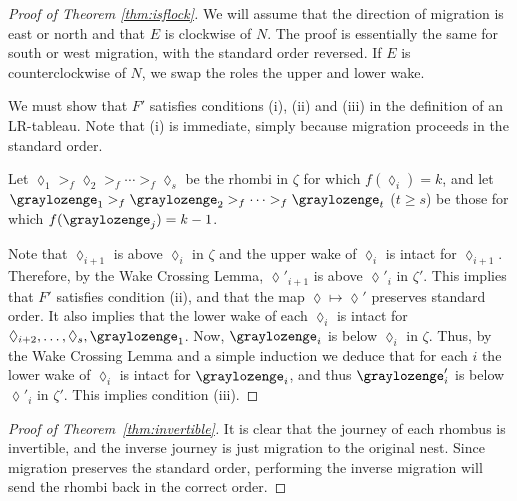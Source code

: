 \begin{proof}[Proof of Theorem \ref{thm:isflock}]
We will assume that the direction of migration is east or north
and that $E$ is clockwise of $N$.
The proof is essentially the same for south or west migration,
with the standard order reversed.  If $E$ is counterclockwise of $N$,
we swap the roles the upper and lower wake.

We must show that $F'$ satisfies conditions (i), (ii) and (iii)
in the definition of an LR-tableau.
Note that (i) is immediate,
simply because migration proceeds in the standard order.

Let $\lozenge_1 >_f \lozenge_2 >_f \dotsb >_f \lozenge_s$
be the rhombi in $\zeta$ for which $f(\lozenge_i) = k$,
and let $\graylozenge_1 >_f \graylozenge_2 >_f  
\dotsb >_f \graylozenge_t$  ($t \geq s$) be those for 
which $f(\graylozenge_j) = k-1$.

Note that $\lozenge_{i+1}$ is above $\lozenge_i$ in $\zeta$
and the upper wake of $\lozenge_i$ is intact for $\lozenge_{i+1}$.
Therefore, by the Wake Crossing Lemma, $\lozenge'_{i+1}$ is above 
$\lozenge'_i$ in $\zeta'$.  
This implies that $F'$ satisfies condition (ii), and that the map
$\lozenge \mapsto \lozenge'$ preserves standard order.  It also implies that 
the lower wake of each $\lozenge_i$ is intact for $\lozenge_{i+2}, \dotsc, 
\lozenge_s, \graylozenge_1$.  Now, $\graylozenge_i$ is below
$\lozenge_i$ in $\zeta$.  Thus, by the Wake Crossing Lemma
 and a simple induction we deduce
that for each $i$ the lower wake of $\lozenge_i$ is intact for 
$\graylozenge_i$, and thus $\graylozenge'_i$ is below $\lozenge'_i$
in $\zeta'$.  This implies condition (iii).
\end{proof}

\begin{proof}[Proof of Theorem~\ref{thm:invertible}]
It is clear that the journey of each rhombus is invertible, and
the inverse journey is just migration to the original nest.  Since
migration preserves the standard order, performing the inverse
migration will send the rhombi back in the correct order.
\end{proof}

